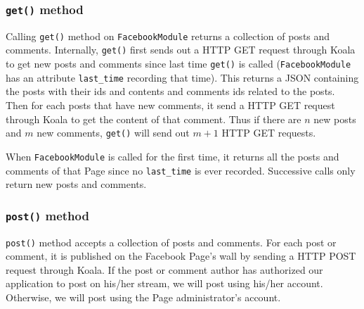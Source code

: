 \subsubsection{\texttt{get()} method} %
\label{ssub:get()_method}

Calling \texttt{get()} method on \texttt{FacebookModule} returns a collection of posts and comments. Internally, \texttt{get()} first sends out a HTTP GET request through Koala to get new posts and comments since last time \texttt{get()} is called (\texttt{FacebookModule} has an attribute \texttt{last\_time} recording that time). This returns a JSON containing the posts with their ids and contents and comments ids related to the posts. Then for each posts that have new comments, it send a HTTP GET request through Koala to get the content of that comment. 
Thus if there are $n$ new posts and $m$ new comments, \texttt{get()} will send out $m+1$ HTTP GET requests.

When \texttt{FacebookModule} is called for the first time, it returns all the posts and comments of that Page since no \texttt{last\_time} is ever recorded. Successive calls only return new posts and comments.


\subsubsection{\texttt{post()} method} %
\label{ssub:post()_method}

\texttt{post()} method accepts a collection of posts and comments. For each post or comment, it is published on the Facebook Page's wall by sending a HTTP POST request through Koala. If the post or comment author has authorized our application to post on his/her stream, we will post using his/her account. Otherwise, we will post using the Page administrator's account.  



